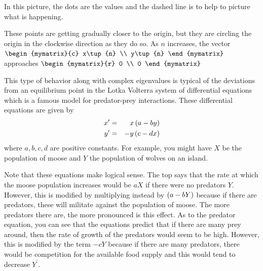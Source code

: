 \begin{solution}
In this picture, the dots are the values and the dashed line is to help to
picture what is happening.

These points are getting gradually closer to the origin, but they are
circling the origin in the clockwise direction as they do so. As $n$ increases,
the vector  $\begin{mymatrix}{c}
x\tup{n} \\
y\tup{n}
\end{mymatrix}$ approaches $ \begin{mymatrix}{r}
0 \\
0
\end{mymatrix}$
\end{solution}

This type of behavior along with complex eigenvalues is typical of the
deviations from an equilibrium point in the Lotka Volterra system of
differential equations which is a famous model for predator-prey
interactions. These differential equations are given by
\begin{eqnarray*}
x^{\prime } &=&x\left(a-by\right) \\
y^{\prime } &=&-y\left(c-dx\right)
\end{eqnarray*}
where $a,b,c,d$ are positive constants. For example, you might have $X$ be
the population of moose and $Y$ the population of wolves on an island.

Note that these equations make logical sense. The top says that the rate at which
the moose population increases would be $aX$ if there were no predators $Y$.
However, this is modified by multiplying instead by $\left(a-bY\right) $
because if there are predators, these will militate against the population
of moose.  The more predators there
are, the more pronounced is this effect. As to the predator equation, you
can see that the equations predict that if there are many prey around, then
the rate of growth of the predators would seem to be high. However, this is
modified by the term $-cY$ because if there are many predators, there would
be competition for the available food supply and this would tend to decrease
$Y^{\prime }$.

